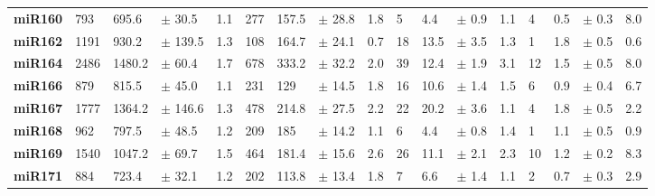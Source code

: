 \begin{landscape}
\begin{table}[]
\begin{tabular}{lllllllllllllllll}
\textbf{miR160}      & 793            & 695.6             & $\pm$  30.5      & 1.1            & 277            & 157.5             & $\pm$  28.8      & 1.8            & 5              & 4.4               & $\pm$  0.9       & 1.1            & 4              & 0.5               & $\pm$  0.3       & 8.0            \\
\textbf{miR162}      & 1191           & 930.2             & $\pm$  139.5     & 1.3            & 108            & 164.7             & $\pm$  24.1      & 0.7            & 18             & 13.5              & $\pm$  3.5       & 1.3            & 1              & 1.8               &  $\pm$ 0.5       & 0.6            \\
\textbf{miR164}      & 2486           & 1480.2            & $\pm$  60.4      & 1.7            & 678            & 333.2             & $\pm$  32.2      & 2.0            & 39             & 12.4              & $\pm$  1.9       & 3.1            & 12             & 1.5               & $\pm$  0.5       & 8.0            \\
\textbf{miR166}      & 879            & 815.5             & $\pm$  45.0      & 1.1            & 231            & 129               & $\pm$  14.5      & 1.8            & 16             & 10.6              & $\pm$  1.4       & 1.5            & 6              & 0.9               & $\pm$  0.4       & 6.7            \\
\textbf{miR167}      & 1777           & 1364.2            & $\pm$  146.6     & 1.3            & 478            & 214.8             & $\pm$  27.5      & 2.2            & 22             & 20.2              & $\pm$  3.6       & 1.1            & 4              & 1.8               & $\pm$  0.5       & 2.2            \\
\textbf{miR168}      & 962            & 797.5             & $\pm$  48.5      & 1.2            & 209            & 185               & $\pm$  14.2      & 1.1            & 6              & 4.4               & $\pm$  0.8       & 1.4            & 1              & 1.1               & $\pm$  0.5       & 0.9            \\
\textbf{miR169}      & 1540           & 1047.2            & $\pm$  69.7      & 1.5            & 464            & 181.4             & $\pm$  15.6      & 2.6            & 26             & 11.1              & $\pm$  2.1       & 2.3            & 10             & 1.2               & $\pm$  0.2       & 8.3            \\
\textbf{miR171}      & 884            & 723.4             & $\pm$  32.1      & 1.2            & 202            & 113.8             & $\pm$  13.4      & 1.8            & 7              & 6.6               & $\pm$  1.4       & 1.1            & 2              & 0.7               & $\pm$  0.3       & 2.9            \\

\end{tabular}
\end{table}
\end{landscape}
